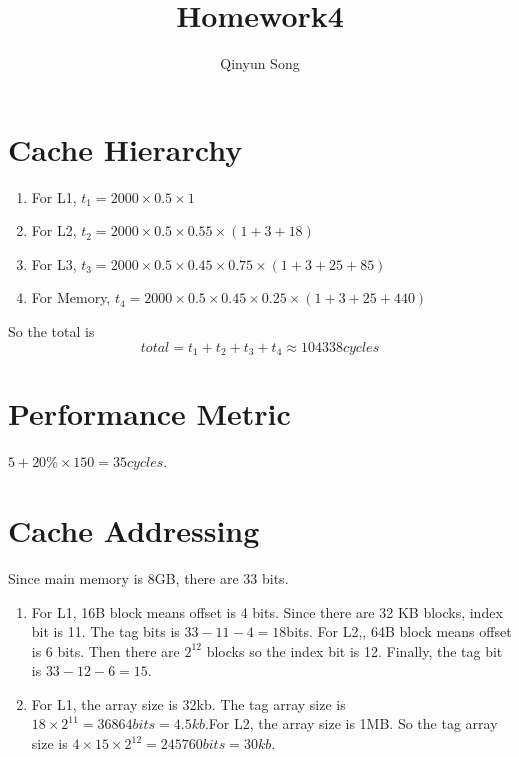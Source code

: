 \documentclass{article}
\title{Homework4}
\author{Qinyun Song}
\date{}
\begin{document}
    \maketitle

    \section{Cache Hierarchy}
    \begin{enumerate}
    \item For L1, $t_1 = 2000 \times 0.5 \times 1$
    \item For L2, $t_2 = 2000 \times 0.5 \times 0.55 \times (1 + 3 + 18)$
    \item For L3, $t_3 = 2000 \times 0.5 \times 0.45 \times 0.75 \times (1 + 3 + 25 + 85)$
    \item For Memory, $t_4 = 2000 \times 0.5 \times 0.45 \times 0.25 \times (1 + 3 + 25 + 440)$
    \end{enumerate}
    So the total is \begin{displaymath}
    total = t_1 + t_2 + t_3 + t_4 \approx 104338 cycles
    \end{displaymath}

    \section{Performance Metric}
    $5 + 20\% \times 150 = 35 cycles$.

    \section{Cache Addressing}
    Since main memory is 8GB, there are 33 bits.
    \begin{enumerate}
    \item For L1, 16B block means offset is 4 bits. Since there are 32 KB blocks, index bit is 11. The tag bits is $33 - 11 -4 = 18 $bits. \newline
    For L2,, 64B block means offset is 6 bits. Then there are $2^{12}$ blocks so the index bit is 12. Finally, the tag bit is $33 - 12 - 6 = 15$.

    \item For L1, the array size is 32kb. The tag array size is $18 \times 2^{11} = 36864 bits = 4.5kb$.\newline For L2, the array size is 1MB. So the tag array size is $4 \times 15 \times 2^{12} = 245760 bits = 30kb$.
    \end{enumerate}
\end{document}
